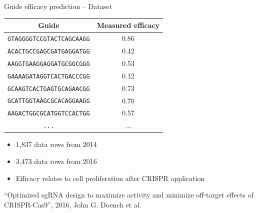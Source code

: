 \documentclass[Nike]{tuberlinbeamer}
\begin{document}
\begin{frame}{Guide efficacy prediction -- Dataset}
\begin{table}[]
    \centering
    \begin{tabular}{cc}
        \textbf{Guide} & \textbf{Measured efficacy} \\ \hline
\texttt{GTAGGGGTCCGTACTCAGCAAGG} & 0.86 \\
\texttt{ACACTGCCGAGCGATGAGGATGG} & 0.42 \\
\texttt{AAGGTGAAGGAGGATGCGGCGGG} & 0.53 \\
\texttt{GAAAAGATAGGTCACTGACCCGG} & 0.12 \\
\texttt{GCAAGTCACTGAGTGCAGAACGG} & 0.73 \\
\texttt{GCATTGGTAAGCGCACAGGAAGG} & 0.70 \\
\texttt{AAGACTGGCGCATGGTCCACTGG} & 0.57 \\
\texttt{...} & ... \\
    \end{tabular}
\end{table}
\begin{itemize}
  \item 1,837 data rows from 2014
  \item 3,473 data rows from 2016
  \item Efficacy relates to cell proliferation after CRISPR application
\end{itemize}
\begin{flushright}
  \tiny
  ``Optimized sgRNA design to maximize activity and minimize off-target effects of CRISPR-Cas9'', 2016, John G. Doench et al.\
\end{flushright}
\end{frame}

\end{document}
